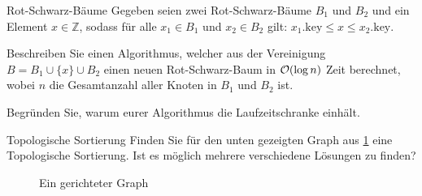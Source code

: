 \documentclass{exercisesheet}
\begin{document}
\begin{eexercises}{Rot-Schwarz-Bäume}{
    Gegeben seien zwei Rot-Schwarz-Bäume $B_1$ und $B_2$ und ein Element $x \in \mathbb{Z}$, sodass für alle $x_1 \in B_1$ und $x_2 \in B_2$ gilt: $x_1.\text{key} \leq x \leq x_2.\text{key}$.
  }
  \item Beschreiben Sie einen Algorithmus, welcher aus der Vereinigung $B = B_1 \cup \{x\} \cup B_2$ einen neuen Rot-Schwarz-Baum in $\mathcal{O}(\log n)$ Zeit berechnet, wobei $n$ die Gesamtanzahl aller Knoten in $B_1$ und $B_2$ ist.
  \item Begründen Sie, warum eurer Algorithmus die Laufzeitschranke einhält.
\end{eexercises}



\begin{exercise}{Topologische Sortierung}
  Finden Sie für den unten gezeigten Graph aus \ref{fig:topo} eine Topologische Sortierung. Ist es möglich mehrere verschiedene Lösungen zu finden?
  \begin{figure}[ht]
    \caption{Ein gerichteter Graph}
    \label{fig:topo}
    \centering
  \end{figure}
\end{exercise}
\end{document}
